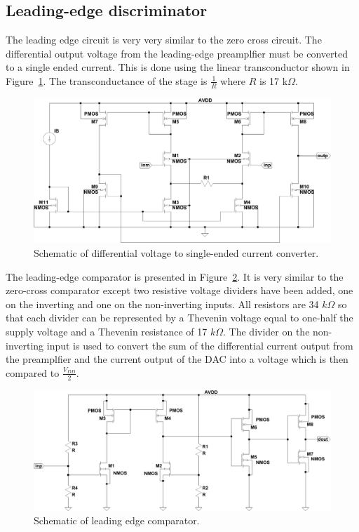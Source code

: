 \documentclass[12pt,oneside,final]{siuethesis}
\theoremstyle{definition}
\begin{document}
\subsection{Leading-edge discriminator}
\par The leading edge circuit is very very similar to the zero cross circuit. The differential output voltage from the leading-edge preamplfier must be converted to a single ended current. This is done using the linear transconductor shown in Figure~\ref{FIG:LE_GM}.  The transconductance of the stage is $\frac{1}{R}$ where $R$ is 17 k$\Omega$.

\begin{figure}[htbp!]
	\centering
 	\includegraphics[scale=0.55,keepaspectratio=true]{../Design_Reports/CFD_circuit_report/images/le_gm.pdf}
 	\caption{Schematic of differential voltage to single-ended current converter.}
 	\label{FIG:LE_GM}
\end{figure}

\par The leading-edge comparator is presented in Figure~\ref{FIG:LE_CMP}. It is very similar to the zero-cross comparator except two resistive voltage dividers have been added, one on the inverting and one on the non-inverting inputs.  All resistors are 34 $k \Omega$ so that each divider can be represented by a Thevenin voltage equal to one-half the supply voltage and a Thevenin resistance of 17 $k \Omega$.  The divider on the non-inverting input is used to convert the sum of the differential current output from the preamplfier and the current output of the DAC into a voltage which is then compared to $\frac{V_{DD}}{2}$.

\begin{figure}[htbp!]
	\centering
 	\includegraphics[scale=0.55,keepaspectratio=true]{../Design_Reports/CFD_circuit_report/images/le_cmp.pdf}
 	\caption{Schematic of leading edge comparator.}
 	\label{FIG:LE_CMP}
\end{figure}
\end{document}
